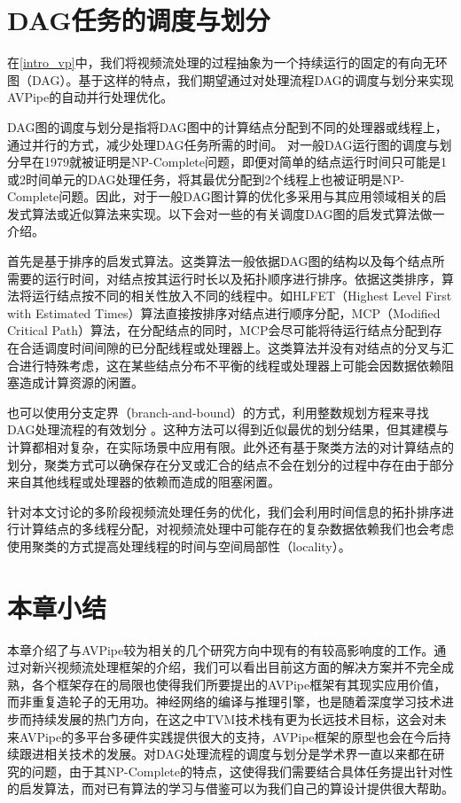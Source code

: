 \section{DAG任务的调度与划分}\label{ch2:dag_sched}
在\ref{intro_vp}中，我们将视频流处理的过程抽象为一个持续运行的固定的有向无环图（DAG）。基于这样的特点，我们期望通过对处理流程DAG的调度与划分来实现AVPipe的自动并行处理优化。\par
DAG图的调度与划分是指将DAG图中的计算结点分配到不同的处理器或线程上，通过并行的方式，减少处理DAG任务所需的时间。
对一般DAG运行图的调度与划分早在1979就被证明是NP-Complete问题\cite{garey1979computers}，即便对简单的结点运行时间只可能是1或2时间单元的DAG处理任务，将其最优分配到2个线程上也被证明是NP-Complete问题。因此，对于一般DAG图计算的优化多采用与其应用领域相关的启发式算法或近似算法来实现\cite{kwok1999static}。以下会对一些的有关调度DAG图的启发式算法做一介绍。\par
首先是基于排序的启发式算法。这类算法一般依据DAG图的结构以及每个结点所需要的运行时间，对结点按其运行时长以及拓扑顺序进行排序。依据这类排序，算法将运行结点按不同的相关性放入不同的线程中。如HLFET（Highest Level First with Estimated Times）算法\cite{adam1974comparison}直接按排序对结点进行顺序分配，MCP（Modified Critical Path）算法\cite{wu1990hypertool}，在分配结点的同时，MCP会尽可能将待运行结点分配到存在合适调度时间间隙的已分配线程或处理器上。这类算法并没有对结点的分叉与汇合进行特殊考虑，这在某些结点分布不平衡的线程或处理器上可能会因数据依赖阻塞造成计算资源的闲置。\par

也可以使用分支定界（branch-and-bound）的方式，利用整数规划方程来寻找DAG处理流程的有效划分 \cite{nossack2014branch}。这种方法可以得到近似最优的划分结果，但其建模与计算都相对复杂，在实际场景中应用有限。此外还有基于聚类方法的对计算结点的划分\cite{wong2003clustering}，聚类方式可以确保存在分叉或汇合的结点不会在划分的过程中存在由于部分来自其他线程或处理器的依赖而造成的阻塞闲置。\par

针对本文讨论的多阶段视频流处理任务的优化，我们会利用时间信息的拓扑排序进行计算结点的多线程分配，对视频流处理中可能存在的复杂数据依赖我们也会考虑使用聚类的方式提高处理线程的时间与空间局部性（locality）。\par

\section{本章小结}
本章介绍了与AVPipe较为相关的几个研究方向中现有的有较高影响度的工作。通过对新兴视频流处理框架的介绍，我们可以看出目前这方面的解决方案并不完全成熟，各个框架存在的局限也使得我们所要提出的AVPipe框架有其现实应用价值，而非重复造轮子的无用功。神经网络的编译与推理引擎，也是随着深度学习技术进步而持续发展的热门方向，在这之中TVM技术栈有更为长远技术目标，这会对未来AVPipe的多平台多硬件实践提供很大的支持，AVPipe框架的原型也会在今后持续跟进相关技术的发展。对DAG处理流程的调度与划分是学术界一直以来都在研究的问题，由于其NP-Complete的特点，这使得我们需要结合具体任务提出针对性的启发算法，而对已有算法的学习与借鉴可以为我们自己的算设计提供很大帮助。